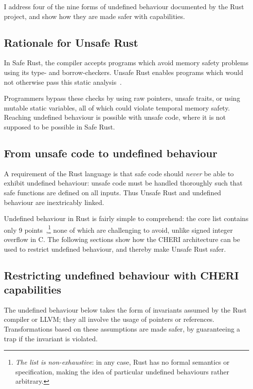 \documentclass[dissertation.tex]{subfiles}
\begin{document}
I address four of the nine forms of undefined behaviour documented by
the Rust project, and show how they are made safer with capabilities.

\subsection{Rationale for Unsafe Rust}
In Safe Rust, the compiler accepts programs which avoid memory safety
problems using its type- and borrow-checkers.
Unsafe Rust enables programs which would not otherwise pass this static
analysis~\cite{rust-trpl-book}.

Programmers bypass these checks by using raw pointers, unsafe traits, or
using mutable static variables, all of which could violate temporal
memory safety.
Reaching undefined behaviour is possible with unsafe code, where it is
not supposed to be possible in Safe Rust.


\subsection{From unsafe code to undefined behaviour}
A requirement of the Rust language is that safe code should \emph{never}
be able to exhibit undefined behaviour: unsafe code must be handled
thoroughly such that safe functions are defined on all inputs.
Thus Unsafe Rust and undefined behaviour are inextricably linked.

Undefined behaviour in Rust is fairly simple to comprehend:
the core list contains only 9 points~\cite{rust-ref},\footnote{
\emph{The list is non-exhaustive}: in any case, Rust has no formal
semantics or specification, making the idea of particular undefined
behaviours rather arbitrary.}
none of which are challenging to avoid, unlike signed integer overflow
in C.
The following sections show how the CHERI architecture can be used to
restrict undefined behaviour, and thereby make Unsafe Rust safer.


\subsection{Restricting undefined behaviour with CHERI capabilities}
\label{sec:eval-betterunsafe-reasons}

The undefined behaviour below takes the form of invariants assumed by
the Rust compiler or LLVM; they all involve the usage of pointers or
references.
Transformations based on these assumptions are made safer, by
guaranteeing a trap if the invariant is violated.
\end{document}
